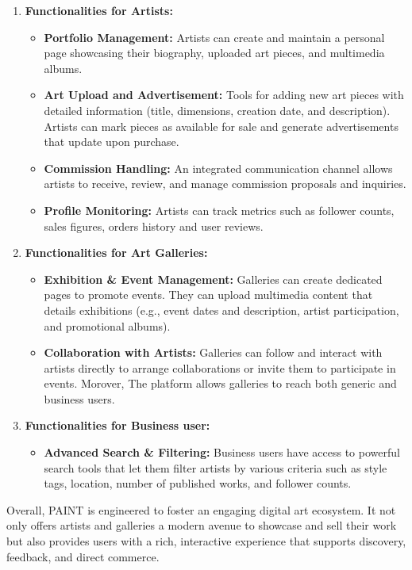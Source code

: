 \begin{enumerate}
    \item \textbf{Functionalities for Artists:}
    \begin{itemize}
        \item \textbf{Portfolio Management:} Artists can create and maintain a personal page showcasing their biography, uploaded art pieces, and multimedia albums.
        \item \textbf{Art Upload and Advertisement:} Tools for adding new art pieces with detailed information (title, dimensions, creation date, and description). Artists can mark pieces as available for sale and generate advertisements that update upon purchase.
        \item \textbf{Commission Handling:} An integrated communication channel allows artists to receive, review, and manage commission proposals and inquiries.
        \item \textbf{Profile Monitoring:} Artists can track metrics such as follower counts, sales figures, orders history and user reviews.
    \end{itemize}
    
    \item \textbf{Functionalities for Art Galleries:}
    \begin{itemize}
        \item \textbf{Exhibition \& Event Management:} Galleries can create dedicated pages to promote events. They can upload multimedia content that details exhibitions (e.g., event dates and description, artist participation, and promotional albums).
        \item \textbf{Collaboration with Artists:} Galleries can follow and interact with artists directly to arrange collaborations or invite them to participate in events. Morover, The platform allows galleries to reach both generic and business users.
    \end{itemize}
  
    \item \textbf{Functionalities for Business user:}
    \begin{itemize}
        \item \textbf{Advanced Search \& Filtering:} Business users have access to powerful search tools that let them filter artists by various criteria such as style tags, location, number of published works, and follower counts.
    \end{itemize}
\end{enumerate}

Overall, PAINT is engineered to foster an engaging digital art ecosystem. It not only offers artists and galleries a modern avenue to showcase and sell their work but also provides users with a rich, interactive experience that supports discovery, feedback, and direct commerce.


